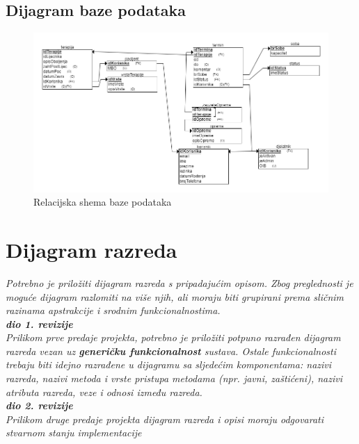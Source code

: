 			
			\subsection{Dijagram baze podataka}
		\begin{figure}[H]
			\includegraphics[width=\textwidth]{slike/Relacijska_shema.PNG} %
			\caption{Relacijska shema baze podataka}
			\label{fig:relacijska_shema1} %
		\end{figure}
			
		\section{Dijagram razreda}
		
			\textit{Potrebno je priložiti dijagram razreda s pripadajućim opisom. Zbog preglednosti je moguće dijagram razlomiti na više njih, ali moraju biti grupirani prema sličnim razinama apstrakcije i srodnim funkcionalnostima.}\\
			
			\textbf{\textit{dio 1. revizije}}\\
			
			\textit{Prilikom prve predaje projekta, potrebno je priložiti potpuno razrađen dijagram razreda vezan uz \textbf{generičku funkcionalnost} sustava. Ostale funkcionalnosti trebaju biti idejno razrađene u dijagramu sa sljedećim komponentama: nazivi razreda, nazivi metoda i vrste pristupa metodama (npr. javni, zaštićeni), nazivi atributa razreda, veze i odnosi između razreda.}\\
			
			\textbf{\textit{dio 2. revizije}}\\			
			
			\textit{Prilikom druge predaje projekta dijagram razreda i opisi moraju odgovarati stvarnom stanju implementacije}
			
